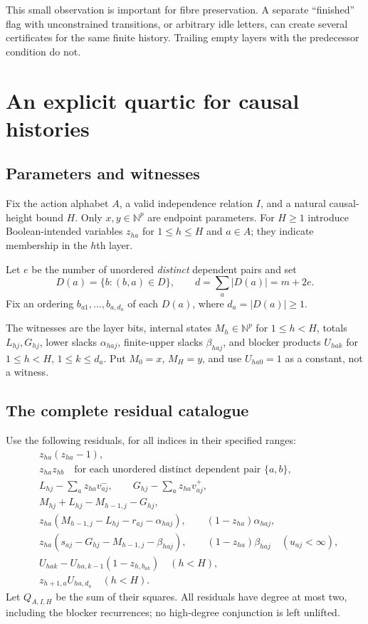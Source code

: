 \documentclass[11pt,a4paper]{article}
\theoremstyle{definition}
\theoremstyle{remark}
\newcommand{\N}{\mathbb N}
\newcommand{\srctag}[1]{\texorpdfstring{\hspace{0.5em}{\normalfont\small\color{accent}[#1]}}{ [#1]}}
\begin{document}
This small observation is important for fibre preservation. A separate ``finished'' flag with unconstrained transitions, or arbitrary idle letters, can create several certificates for the same finite history. Trailing empty layers with the predecessor condition do not.

\section{An explicit quartic for causal histories\srctag{01}}\label{cdc:ct:sec:history}
\subsection{Parameters and witnesses}
Fix the action alphabet $A$, a valid independence relation $I$, and a natural causal-height bound $H$. Only $x,y\in\N^p$ are endpoint parameters. For $H\ge1$ introduce Boolean-intended variables $z_{ha}$ for $1\le h\le H$ and $a\in A$; they indicate membership in the $h$th layer.

Let $e$ be the number of unordered \emph{distinct} dependent pairs and set
\[
 D(a)=\{b:(b,a)\in D\},\qquad
 d=\sum_a |D(a)|=m+2e.
\]
Fix an ordering $b_{a1},\ldots,b_{a,d_a}$ of each $D(a)$, where $d_a=|D(a)|\ge1$.

The witnesses are the layer bits, internal states $M_h\in\N^p$ for $1\le h<H$, totals $L_{hj},G_{hj}$, lower slacks $\alpha_{haj}$, finite-upper slacks $\beta_{haj}$, and blocker products $U_{hak}$ for $1\le h<H$, $1\le k\le d_a$. Put $M_0=x$, $M_H=y$, and use $U_{ha0}=1$ as a constant, not a witness.

\subsection{The complete residual catalogue}
Use the following residuals, for all indices in their specified ranges:
\begin{align}
 &z_{ha}(z_{ha}-1),\label{cdc:ct:eq:hist-bool}\\
 &z_{ha}z_{hb}\quad\text{for each unordered distinct dependent pair }\{a,b\},
 \label{cdc:ct:eq:hist-clique}\\
 &L_{hj}-\sum_a z_{ha}v_{aj}^-,\qquad
 G_{hj}-\sum_a z_{ha}v_{aj}^+,\label{cdc:ct:eq:hist-total}\\
 &M_{hj}+L_{hj}-M_{h-1,j}-G_{hj},\label{cdc:ct:eq:hist-end}\\
 &z_{ha}(M_{h-1,j}-L_{hj}-r_{aj}-\alpha_{haj}),\qquad
 (1-z_{ha})\alpha_{haj},\label{cdc:ct:eq:hist-low}\\
 &z_{ha}(s_{aj}-G_{hj}-M_{h-1,j}-\beta_{haj}),\qquad
 (1-z_{ha})\beta_{haj}\quad(u_{aj}<\infty),\label{cdc:ct:eq:hist-up}\\
 &U_{hak}-U_{ha,k-1}(1-z_{h,b_{ak}})\quad(h<H),\label{cdc:ct:eq:blockers}\\
 &z_{h+1,a}U_{ha,d_a}\quad(h<H).\label{cdc:ct:eq:hist-foata}
\end{align}
Let $Q_{A,I,H}$ be the sum of their squares. All residuals have degree at most two, including the blocker recurrences; no high-degree conjunction is left unlifted.
\end{document}
